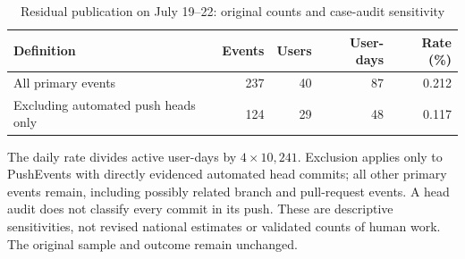 \begin{table}[htbp]
\centering\small
\caption{Residual publication on July 19--22: original counts and case-audit sensitivity}
\label{tab:evidence_audit}
\begin{threeparttable}
\begin{tabular}{@{}p{}rrrr@{}}
\toprule
Definition & Events & Users & User-days & Rate (\%) \\
\midrule
All primary events & 237 & 40 & 87 & 0.212 \\
Excluding automated push heads only & 124 & 29 & 48 & 0.117 \\
\bottomrule
\end{tabular}
\begin{tablenotes}[flushleft]\footnotesize
\item The daily rate divides active user-days by $4\times10{,}241$. Exclusion applies only to PushEvents with directly evidenced automated head commits; all other primary events remain, including possibly related branch and pull-request events. A head audit does not classify every commit in its push. These are descriptive sensitivities, not revised national estimates or validated counts of human work. The original sample and outcome remain unchanged.
\end{tablenotes}\end{threeparttable}
\end{table}
